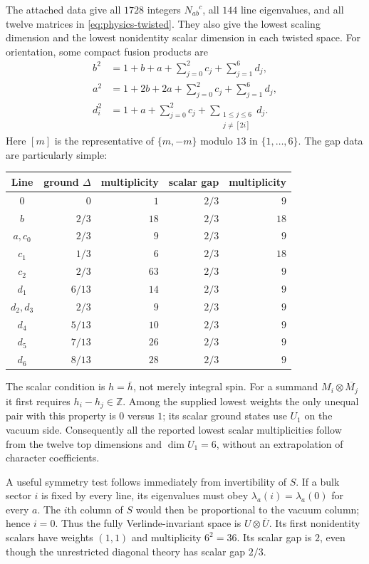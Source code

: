 The attached data give all $1728$ integers $N_{ab}^{\phantom{ab}c}$,
all $144$ line eigenvalues, and all twelve matrices in
\eqref{eq:physics-twisted}. They also give the lowest scaling dimension
and the lowest nonidentity scalar dimension in each twisted space.
For orientation, some compact fusion products are
\begin{align}
 b^2&=1+b+a+\sum_{j=0}^2c_j+\sum_{j=1}^6d_j,\\
 a^2&=1+2b+2a+\sum_{j=0}^2c_j+\sum_{j=1}^6d_j,\\
 d_i^2&=1+a+\sum_{j=0}^2c_j+
                 \sum_{\substack{1\leq j\leq6\\j\ne[2i]}}d_j.
\end{align}
Here $[m]$ is the representative of $\{m,-m\}$ modulo $13$ in
$\{1,\ldots,6\}$. The gap data are particularly simple:
\begin{center}
\begin{tabular}{c|rr|rr}
\toprule
Line&ground $\Delta$&multiplicity&scalar gap&multiplicity\\
\midrule
$0$&$0$&$1$&$2/3$&$9$\\
$b$&$2/3$&$18$&$2/3$&$18$\\
$a,c_0$&$2/3$&$9$&$2/3$&$9$\\
$c_1$&$1/3$&$6$&$2/3$&$18$\\
$c_2$&$2/3$&$63$&$2/3$&$9$\\
$d_1$&$6/13$&$14$&$2/3$&$9$\\
$d_2,d_3$&$2/3$&$9$&$2/3$&$9$\\
$d_4$&$5/13$&$10$&$2/3$&$9$\\
$d_5$&$7/13$&$26$&$2/3$&$9$\\
$d_6$&$8/13$&$28$&$2/3$&$9$\\
\bottomrule
\end{tabular}
\end{center}
The scalar condition is $h=\bar h$, not merely integral spin.
For a summand $M_i\otimes\overline{M_j}$ it first requires
$h_i-h_j\in\mathbb Z$. Among the supplied lowest weights the only
unequal pair with this property is $0$ versus $1$; its scalar ground
states use $U_1$ on the vacuum side. Consequently all the reported
lowest scalar multiplicities follow from the twelve top dimensions and
$\dim U_1=6$, without an extrapolation of character coefficients.

A useful symmetry test follows immediately from invertibility of $S$.
If a bulk sector $i$ is fixed by every line, its eigenvalues must obey
$\lambda_a(i)=\lambda_a(0)$ for every $a$. The $i$th column of $S$
would then be proportional to the vacuum column; hence $i=0$.
Thus the fully Verlinde-invariant space is
$U\otimes\overline U$. Its first nonidentity scalars have weights
$(1,1)$ and multiplicity $6^2=36$. Its scalar gap is $2$, even though
the unrestricted diagonal theory has scalar gap $2/3$.

